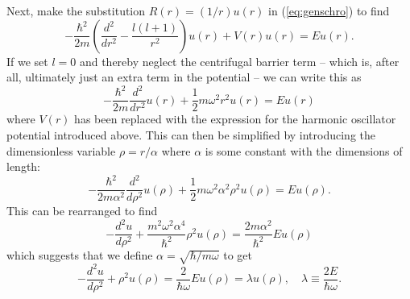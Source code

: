 \documentclass[aps,prc,reprint]{revtex4-1}
\begin{document}
        Next, make the substitution $R(r) = (1/r) u(r)$ in (\ref{eq:genschro}) to find
        \begin{equation*}
            -\frac{\hbar^2}{2m} \left( \frac{d^2}{dr^2} - \frac{l(l+1)}{r^2} \right) u(r) + V(r)u(r) = Eu(r).
        \end{equation*}
        If we set $l = 0$ and thereby neglect the centrifugal barrier term -- which is, after all, ultimately just an extra term in the potential -- we can write this as
        \begin{equation*}
            -\frac{\hbar^2}{2m} \frac{d^2}{dr^2} u(r) + \frac{1}{2} m \omega^2 r^2 u(r) = Eu(r)
        \end{equation*}
        where $V(r)$ has been replaced with the expression for the harmonic oscillator potential introduced above. This can then be simplified by introducing the dimensionless variable $\rho = r / \alpha$ where $\alpha$ is some constant with the dimensions of length:
        \begin{equation*}
            -\frac{\hbar^2}{2m\alpha^2} \frac{d^2}{d\rho^2} u(\rho) + \frac{1}{2} m \omega^2 \alpha^2 \rho^2 u(\rho) = Eu(\rho).
        \end{equation*}
        This can be rearranged to find
        \begin{equation*}
            -\frac{d^2 u}{d\rho^2} + \frac{m^2\omega^2\alpha^4}{\hbar^2} \rho^2 u(\rho) = \frac{2m\alpha^2}{\hbar^2} E u(\rho)
        \end{equation*}
        which suggests that we define $\alpha = \sqrt{\hbar / m\omega}$ to get
        \begin{equation}
            -\frac{d^2 u}{d\rho^2} + \rho^2 u(\rho) = \frac{2}{\hbar\omega} E u(\rho) = \lambda u(\rho),\quad \lambda \equiv \frac{2E}{\hbar\omega}.  \label{eq:oneelecfinal}
        \end{equation}
\end{document}
